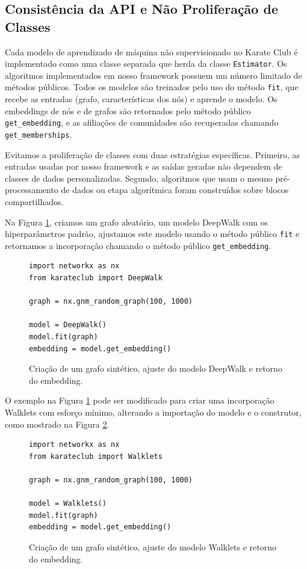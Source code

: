 \documentclass[sigconf]{acmart}
\begin{document}
\subsection{Consistência da API e Não Proliferação de Classes}

Cada modelo de aprendizado de máquina não supervisionado no Karate Club é implementado como uma classe separada que herda da classe \texttt{Estimator}. Os algoritmos implementados em nosso framework possuem um número limitado de métodos públicos. Todos os modelos são treinados pelo uso do método \texttt{fit}, que recebe as entradas (grafo, características dos nós) e aprende o modelo. Os embeddings de nós e de grafos são retornados pelo método público \texttt{get\_embedding}, e as afiliações de comunidades são recuperadas chamando \texttt{get\_memberships}.

Evitamos a proliferação de classes com duas estratégias específicas. Primeiro, as entradas usadas por nosso framework e as saídas geradas não dependem de classes de dados personalizadas. Segundo, algoritmos que usam o mesmo pré-processamento de dados ou etapa algorítmica foram construídos sobre blocos compartilhados.

Na Figura \ref{fig:code2}, criamos um grafo aleatório, um modelo DeepWalk com os hiperparâmetros padrão, ajustamos este modelo usando o método público \texttt{fit} e retornamos a incorporação chamando o método público \texttt{get\_embedding}.

\begin{figure}[h]
\begin{lstlisting}
import networkx as nx
from karateclub import DeepWalk

graph = nx.gnm_random_graph(100, 1000)

model = DeepWalk()
model.fit(graph)
embedding = model.get_embedding()
\end{lstlisting}
\caption{Criação de um grafo sintético, ajuste do modelo DeepWalk e retorno do embedding.}
\label{fig:code2}
\end{figure}

O exemplo na Figura \ref{fig:code2} pode ser modificado para criar uma incorporação Walklets com esforço mínimo, alterando a importação do modelo e o construtor, como mostrado na Figura \ref{fig:code3}.

\begin{figure}[h]
\begin{lstlisting}
import networkx as nx
from karateclub import Walklets

graph = nx.gnm_random_graph(100, 1000)

model = Walklets()
model.fit(graph)
embedding = model.get_embedding()
\end{lstlisting}
\caption{Criação de um grafo sintético, ajuste do modelo Walklets e retorno do embedding.}
\label{fig:code3}
\end{figure}
\end{document}
